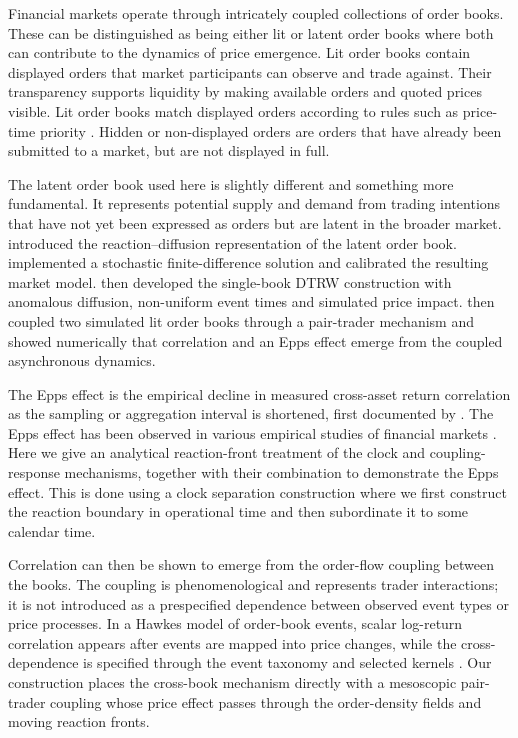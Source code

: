 \documentclass[5p,final]{elsarticle}
\begin{document}
Financial markets operate through intricately coupled collections of order books. These can be distinguished as being either lit or latent order books where both can contribute to the dynamics of price emergence. Lit order books contain displayed orders that market participants can observe and trade against. Their transparency supports liquidity by making available orders and quoted prices visible. Lit order books match displayed orders according to rules such as price-time priority \citep{ohara1995}. Hidden or non-displayed orders are orders that have already been submitted to a market, but are not displayed in full. 

The latent order book \citep{toth2011} used here is slightly different and something more fundamental. It represents potential supply and demand from trading intentions that have not yet been expressed as orders but are latent in the broader market. \citet{donier2015} introduced the reaction--diffusion representation of the latent order book. \citet{Gant2022b} implemented a stochastic finite-difference solution \citep{angstmann2019advection,angstmann2016} and calibrated the resulting market model. \citet{DianaGebbie2025} then developed the single-book DTRW construction with anomalous diffusion, non-uniform event times and simulated price impact. \citet{BauerDianaGebbie2024} then coupled two simulated lit order books through a pair-trader mechanism and showed numerically that correlation and an Epps effect emerge from the coupled asynchronous dynamics. 

The Epps effect is the empirical decline in measured cross-asset return correlation as the sampling or aggregation interval is shortened, first documented by \citet{epps1979}. The Epps effect has been observed in various empirical studies of financial markets \citep{toth2009,mastromatteo2011}. Here we give an analytical reaction-front treatment of the clock and coupling-response mechanisms, together with their combination to demonstrate the Epps effect. This is done using a clock separation construction where we first construct the reaction boundary in operational time and then subordinate it to some calendar time.

Correlation can then be shown to emerge from the order-flow coupling between the books. The coupling is phenomenological and represents trader interactions; it is not introduced as a prespecified dependence between observed event types or price processes. In a Hawkes model of order-book events, scalar log-return correlation appears after events are mapped into price changes, while the cross-dependence is specified through the event taxonomy and selected kernels \citep{bacry2015,chang2025discrete}. Our construction places the cross-book mechanism directly with a mesoscopic pair-trader coupling whose price effect passes through the order-density fields and moving reaction fronts.
\end{document}
